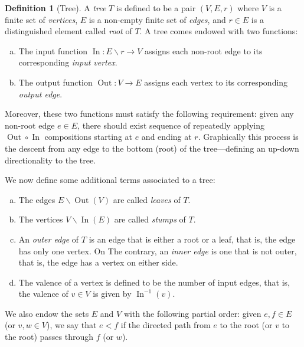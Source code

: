\documentclass[11pt, reqno]{amsart}
\theoremstyle{definition}
\newtheorem{definition}[theorem]{Definition}
\renewcommand{\setminus}{\smallsetminus}
\DeclareMathOperator{\Input}{In}
\DeclareMathOperator{\Output}{Out}
\begin{document}
\begin{definition}[Tree]
\label{def:tree-operad}
A \emph{tree} \(T\) is defined to be a pair \((V, E, r)\) where \(V\) is a
finite set of \emph{vertices}, \(E\) is a non-empty finite set of \emph{edges},
and \(r \in E\) is a distinguished element called \emph{root} of \(T\). A tree
comes endowed with two functions:
\begin{enumerate}[(a)]\setlength\itemsep{0em}
\item The input function \(\Input: E \setminus r \to V\) assigns each non-root
    edge to its corresponding \emph{input vertex}.

\item The output function \(\Output: V \to E\) assigns each vertex to its
    corresponding \emph{output edge}.
\end{enumerate}
Moreover, these two functions must satisfy the following requirement: given any
non-root edge \(e \in E\), there should exist sequence of repeatedly applying
\(\Output \circ \Input\) compositions starting at \(e\) and ending at \(r\).
Graphically this process is the descent from any edge to the bottom (root) of
the tree---defining an up-down directionality to the tree.

We now define some additional terms associated to a tree:
\begin{enumerate}[(a)]\setlength\itemsep{0em}
\item The edges \(E \setminus \Output(V)\) are called \emph{leaves} of \(T\).

\item The vertices \(V \setminus \Input(E)\) are called \emph{stumps} of \(T\).

\item An \emph{outer edge} of \(T\) is an edge that is either a root or a
  leaf, that is, the edge has only one vertex. On The contrary, an \emph{inner
  edge} is one that is not outer, that is, the edge has a vertex on either
  side.

\item The valence of a vertex is defined to be the number of input edges, that
    is, the valence of \(v \in V\) is given by \(\Input^{-1}(v)\).
\end{enumerate}
We also endow the sets \(E\) and \(V\) with the following partial order: given
\(e, f \in E\) (or \(v, w \in V\)), we say that \(e < f\) if the directed path
from \(e\) to the root (or \(v\) to the root) passes through \(f\) (or \(w\)).
\end{definition}
\end{document}
